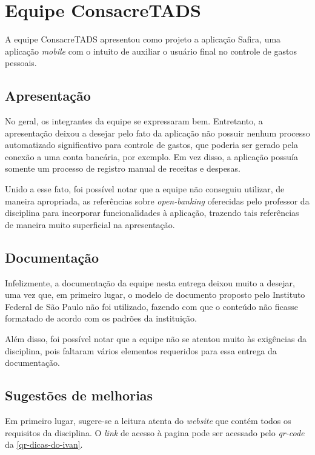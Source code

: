 \chapter{Equipe ConsacreTADS}

A equipe ConsacreTADS apresentou como projeto a aplicação Safira, uma aplicação \textit{\gls{mobile}} com o intuito de auxiliar o usuário final no controle de gastos pessoais.

\section{Apresentação}

No geral, os integrantes da equipe se expressaram bem. Entretanto, a apresentação deixou a desejar pelo fato da aplicação não possuir nenhum processo automatizado significativo para controle de gastos, que poderia ser gerado pela conexão a uma conta bancária, por exemplo. Em vez disso, a aplicação possuía somente um processo de registro manual de receitas e despesas.


Unido a esse fato, foi possível notar que a equipe não conseguiu utilizar, de maneira apropriada, as referências sobre \textit{\gls{open-banking}} oferecidas pelo professor da disciplina para incorporar funcionalidades à aplicação, trazendo tais referências de maneira muito superficial na apresentação.

\section{Documentação}
Infelizmente, a documentação da equipe nesta entrega deixou muito a desejar, uma vez que, em primeiro lugar, o modelo de documento proposto pelo Instituto Federal de São Paulo não foi utilizado, fazendo com que o conteúdo não ficasse formatado de acordo com os padrões da instituição.


Além disso, foi possível notar que a equipe não se atentou muito às exigências da disciplina, pois faltaram vários elementos requeridos para essa entrega da documentação.

\section{Sugestões de melhorias}
Em primeiro lugar, sugere-se a leitura atenta do \textit{website} que contém todos os requisitos da disciplina. O \textit{\gls{link}} de acesso à pagina pode ser acessado pelo \textit{\gls{qr-code}} da \autoref{qr-dicas-do-ivan}.

